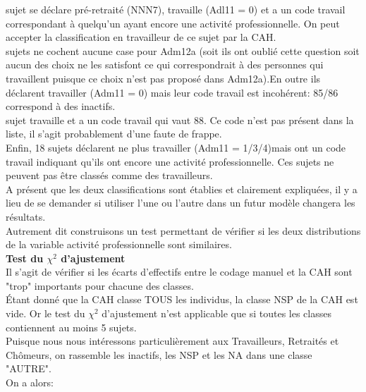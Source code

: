 \documentclass{book}
\begin{document}
\bigskip

 sujet se déclare pré-retraité (NNN7), travaille (Adl11 = 0) et a un code travail correspondant à quelqu'un ayant encore une activité professionnelle. On peut accepter la classification en travailleur de ce sujet par la CAH.\\

 sujets ne cochent aucune case pour Adm12a (soit ils ont oublié cette question soit aucun des choix ne les satisfont ce qui correspondrait à des personnes qui travaillent puisque ce choix n'est pas proposé dans Adm12a).En outre ils déclarent travailler (Adm11 = 0) mais leur code travail est incohérent: 85/86 correspond à des inactifs.\\

 sujet travaille et a un code travail qui vaut 88. Ce code n'est pas présent dans la liste, il s'agit probablement d'une faute de frappe.\\

\noindent
Enfin, 18 sujets déclarent ne plus travailler (Adm11 = 1/3/4)mais ont un code travail indiquant qu'ils ont encore une activité professionnelle. Ces sujets ne peuvent pas être classés comme des travailleurs.\\

\noindent
A présent que les deux classifications sont établies et clairement expliquées, il y a lieu de se demander si utiliser l'une ou l'autre dans un futur modèle changera les résultats.\\
Autrement dit construisons un test permettant de vérifier si les deux distributions de la variable activité professionnelle sont similaires.\\

\noindent
\textbf{Test du $\chi ^2$ d'ajustement}\\
Il s'agit de vérifier si les écarts d'effectifs entre le codage manuel et la CAH sont "trop" importants pour chacune des classes.\\
Étant donné que la CAH classe TOUS les individus, la classe NSP de la CAH est vide.
Or le test du $\chi^2$ d'ajustement n'est applicable que si toutes les classes contiennent au moins 5 sujets.\\
Puisque nous nous intéressons particulièrement aux Travailleurs, Retraités et Chômeurs, on rassemble les inactifs, les NSP et les NA dans une classe "AUTRE".\\
\noindent
On a alors:\\
\end{document}
